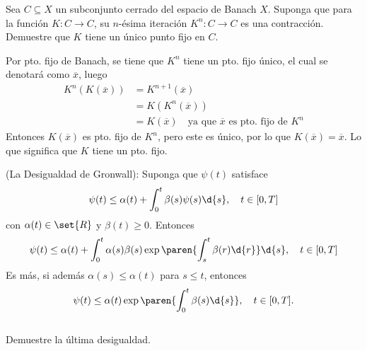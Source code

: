 \documentclass{homework}
\begin{document}
\begin{prob}
    Sea \(C\subseteq X\) un subconjunto cerrado del espacio de Banach \(X\). Suponga que para la función \(K:C\rightarrow C\), su \(n\)-ésima iteración \(K^n:C\rightarrow C\) es una contracción. Demuestre que \(K\) tiene un único punto fijo en \(C\).
\end{prob}

\begin{sol}
    Por pto. fijo de Banach, se tiene que \(K^n\) tiene un pto. fijo único, el cual se denotará como \(\overline{x}\), luego
    \begin{align*}
        K^n(K(\overline{x}))&=K^{n+1}(\overline{x})\\
        &=K(K^n(\overline{x}))\\
        &=K(\overline{x})\quad\text{ya que \(\overline{x}\) es pto. fijo de \(K^n\)}
    \end{align*}
    Entonces \(K(\overline{x})\) es pto. fijo de \(K^n\), pero este es único, por lo que \(K(\overline{x})=\overline{x}\). Lo que significa que \(K\) tiene un pto. fijo.
\end{sol}

\begin{prob}
    (La Desigualdad de Gronwall): Suponga que \(\psi(t)\) satisface
    \[\psi(t)\leq\alpha(t)+\int_0^t\beta(s)\psi(s)\d{s},\quad t\in[0,T]\]
    con \(\alpha(t)\in\set{R}\) y \(\beta(t)\geq0\). Entonces
    \[\psi(t)\leq\alpha(t)+\int_0^t\alpha(s)\beta(s)\exp\paren{\int_s^t\beta(r)\d{r}}\d{s},\quad t\in[0,T]\]
    Es más, si además \(\alpha(s)\leq\alpha(t)\) para \(s\leq t\), entonces
    \[\psi(t)\leq\alpha(t)\exp\paren{\int_0^t\beta(s)\d{s}},\quad t\in[0,T].\]\\
    Demuestre la última desigualdad.
\end{prob}

\begin{sol}

\end{sol}
\end{document}
